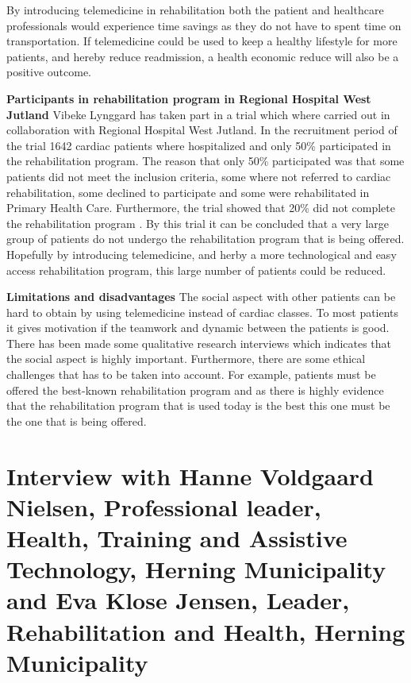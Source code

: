By introducing telemedicine in rehabilitation both the patient and healthcare professionals would experience time savings as they do not have to spent time on transportation. If telemedicine could be used to keep a healthy lifestyle for more patients, and hereby reduce readmission, a health economic reduce will also be a positive outcome.

\textbf{Participants in rehabilitation program in Regional Hospital West Jutland} \newline
Vibeke Lynggard has taken part in a trial which where carried out in collaboration with Regional Hospital West Jutland. In the recruitment period of the trial 1642 cardiac patients where hospitalized and only 50\% participated in the rehabilitation program. The reason that only 50\% participated was that some patients did not meet the inclusion criteria, some where not referred to cardiac rehabilitation, some declined to participate and some were rehabilitated in Primary Health Care. Furthermore, the trial showed that 20\% did not complete the rehabilitation program \cite{rehab}. By this trial it can be concluded that a very large group of patients do not undergo the rehabilitation program that is being offered. Hopefully by introducing telemedicine, and herby a more technological and easy access rehabilitation program, this large number of patients could be reduced. 

\textbf{Limitations and disadvantages} \newline
The social aspect with other patients can be hard to obtain by using telemedicine instead of cardiac classes. To most patients it gives motivation if the teamwork and dynamic between the patients is good. There has been made some qualitative research interviews which indicates that the social aspect is highly important. Furthermore, there are some ethical challenges that has to be taken into account. For example, patients must be offered the best-known rehabilitation program and as there is highly evidence that the rehabilitation program that is used today is the best this one must be the one that is being offered.  

\section{Interview with Hanne Voldgaard Nielsen, Professional leader, Health, Training and Assistive Technology, Herning Municipality and Eva Klose Jensen, Leader, Rehabilitation and Health, Herning Municipality}\label{sec: evahanne}

